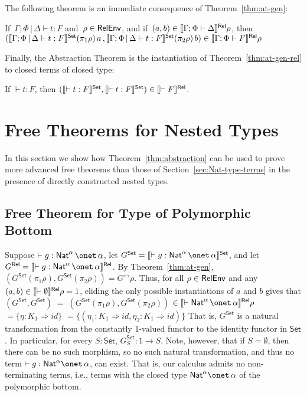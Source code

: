 \documentclass{lmcs}
\theoremstyle{plain}\newtheorem{satz}[thm]{Satz}
\newcommand{\set}{\mathsf{Set}}
\renewcommand{\id}{\mathit{id}}
\begin{document}
The following theorem is an immediate consequence of
Theorem~\ref{thm:at-gen}:
\begin{thm}\label{thm:at-gen-rel}
If \,$\Gamma; \Phi \,|\, \Delta \vdash t : F$ and \,$\rho \in \mathsf{RelEnv}$,
  and if \,$(a, b) \in \llbracket{\Gamma; \Phi \vdash \Delta}\rrbracket^{\mathsf{Rel}} \rho$,
  then \\
  $(\setsem{\Gamma; \Phi \,|\, \Delta \vdash t : F} (\pi_1 \rho) \,a \, ,
      \setsem{\Gamma; \Phi \,|\, \Delta \vdash t : F } (\pi_2 \rho) \,b) \in 
    \relsem{\Gamma; \Phi \vdash F} \rho$
\end{thm}
\noindent
Finally, the Abstraction Theorem is the instantiation of
Theorem~\ref{thm:at-gen-rel} to closed terms of closed type:
\begin{thm}\label{thm:abstraction}
If $\vdash t : F$, then $(\setsem{\vdash t : F},\setsem{\vdash t
  : F}) \in \relsem{\vdash F}$.
\end{thm}

\section{Free Theorems for Nested Types}\label{sec:ftnt}

In this section we show how Theorem~\ref{thm:abstraction} can be used
to prove more advanced free theorems than those of
Section~\ref{sec:Nat-type-terms} in the presence of directly
constructed nested types.

\subsection{Free Theorem for Type of Polymorphic
  Bottom}\label{sec:bottom} 

Suppose $ \vdash g : \Nat^\alpha \,\onet\,\alpha$, let $G^\set =
\setsem{\vdash g : \Nat^\alpha \,\onet\,\alpha}$, and let $G^\rel =
\relsem{\vdash g : \Nat^\alpha \,\onet\,\alpha}$.  By
Theorem~\ref{thm:at-gen}, $(G^\set(\pi_1\rho),G^\set(\pi_2\rho))
= G^\rel\rho$. Thus, for all $\rho \in \mathsf{RelEnv}$ and any $(a, b) \in
\llbracket{\vdash \emptyset}\rrbracket^{\mathsf{Rel}}\rho = 1$, eliding the only possible
instantiations of $a$ and $b$ gives that
$(G^\set,G^\set) \;= \; (G^\set(\pi_1 \rho), G^\set (\pi_2 \rho))$
$ \in  \relsem{\vdash \Nat^\alpha \,\onet\,\alpha}\rho$
$ =  \{\eta : K_1 \Rightarrow \id\}$
$ =  \{(\eta_1 : K_1 \Rightarrow \id, \eta_2 : K_1 \Rightarrow
\id)\}$ 
That is, $G^\set$ is a natural transformation from the constantly
$1$-valued functor to the identity functor in $\set$. In particular,
for every $S : \set$, $G^\set_S : 1 \to S$. Note, however, that if $S
= \emptyset$, then there can be no such morphism, so no such natural
transformation,
and thus no term $\vdash g : \Nat^\alpha \onet \,\alpha$, can exist.
That is, our calculus admits no non-terminating terms, i.e., terms
with the closed type $\Nat^\alpha \onet \,\alpha$ of the polymorphic
bottom.
\end{document}
